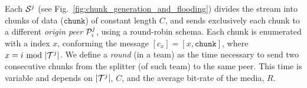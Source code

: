 \label{sec:chunk_generation}
\begin{figure*}
  \caption{Chunk generation and
    flooding.\label{fig:chunk_generation_and_flooding}}
\end{figure*}
Each ${\cal S}^j$ (see Fig.~\ref{fig:chunk_generation_and_flooding})
divides the stream into chunks of data ($\mathtt{chunk}$) of constant
length $C$, and sends exclusively each chunk to a different
\emph{origin peer} ${\cal P}^j_i$, using a round-robin schema. Each
chunk is enumerated with a index $x$, conforming the message
$[c_x]=[x,\mathtt{chunk}]$, where $x=i~\mathrm{mod}~|{\cal T}^j|$. We
define a \emph{round} (in a team) as the time necessary to send two
consecutive chunks from the splitter (of such team) to the same
peer. This time is variable and depends on $|{\cal T}^j|$, $C$, and
the average bit-rate of the media, $R$.

\begin{comment}
The round-time is defined by:
\begin{equation}
  \cal{r} = \cal{c}N.
  \label{eq:round_time}
\end{equation}
For example, if we use only one team of $N=256$ peers, a chunk size
$C=1024$~bytes, and a video of $1$~Mb/s, the round time is
\begin{displaymath}
  \cal{r} = \frac{1024\frac{\text{bytes}}{\text{chunk}}\times
    8\frac{\text{bits}}{\text{byte}}}{10^6\frac{\text{bits}}{\text{second}}}\times
  256 \approx 2.1~\text{seconds}.
\end{displaymath}
\end{comment}
